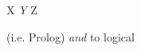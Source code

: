 \documentclass{memoir}
\begin{document}
X \emph{Y} Z

(i.e. Prolog) {\em
and} to logical
\end{document}
